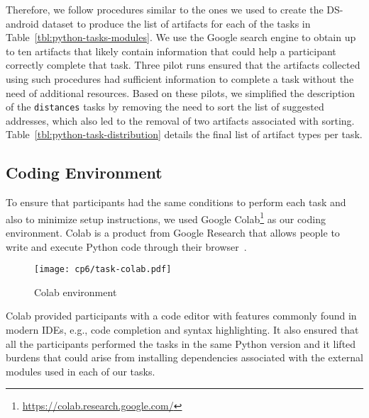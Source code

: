 Therefore,
we follow procedures similar to the ones we used to create the \acs{DS-android} dataset to produce the list of artifacts for each of the tasks in Table~\ref{tbl:python-tasks-modules}. 
We use the Google search engine to obtain up to ten artifacts that likely contain 
information that could help a participant correctly complete that task. 
Three pilot runs ensured that the artifacts collected using such procedures had sufficient information to complete a task without 
the need of additional resources. Based on these pilots, we simplified the description of the \texttt{distances} tasks by removing the need to sort the list of suggested addresses, which also led to the removal of two artifacts associated with sorting. Table~\ref{tbl:python-task-distribution} details the final list 
of artifact types per task.








\subsection{Coding Environment}
\label{cp6:coding-environment}



To ensure that participants had the same conditions to perform each task
and also to minimize setup instructions, we used Google Colab\footnote{\url{https://colab.research.google.com/}} as our coding environment. 
Colab is a product from Google Research that allows people to write and execute Python code through their browser~\cite{google-colab}. 





\begin{figure}
    \centering
    \texttt{[image: cp6/task-colab.pdf]}
    \caption{Colab environment}
    \label{fig:nytimes-task-colab}
\end{figure}



Colab provided participants with a code editor with features commonly found in modern IDEs, e.g., code completion and syntax highlighting. It also ensured that all the participants 
performed the tasks in the same Python version and it lifted 
burdens that could arise from installing dependencies associated with the external modules used in each of our tasks. 


